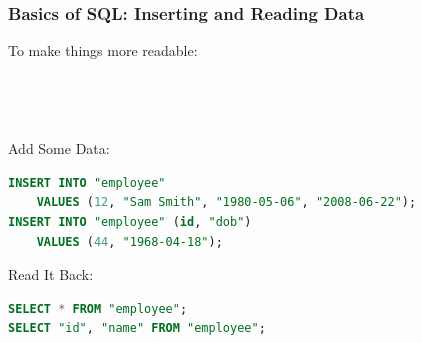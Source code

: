 \documentclass[aspectratio=169]{beamer}
\begin{document}
\begin{frame}[fragile]
    \frametitle{Basics of SQL: Inserting and Reading Data}
    To make things more readable:\\
    \\
    \\
    \\~\\
    Add Some Data:
    \begin{lstlisting}[language=SQL]
INSERT INTO "employee"
    VALUES (12, "Sam Smith", "1980-05-06", "2008-06-22");
INSERT INTO "employee" (id, "dob")
    VALUES (44, "1968-04-18");   
    \end{lstlisting}
    Read It Back:
    \begin{lstlisting}[language=SQL]
SELECT * FROM "employee";
SELECT "id", "name" FROM "employee";
    \end{lstlisting}

    

\end{frame}
\end{document}
